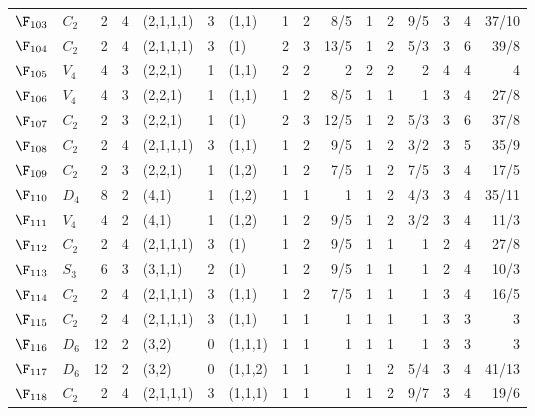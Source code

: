 \begin{landscape}
{\begin{longtable}{@{}l l r r l r l rrr rrr rrr@{}}
\addlinespace[3pt]
\textbf{$\F_{103}$} & $C_{2}$ & 2 & 4 & (2,1,1,1) & 3 & (1,1) & 1 & 2 & 8/5 & 1 & 2 & 9/5 & 3 & 4 & 37/10 \\
\addlinespace[3pt]
\textbf{$\F_{104}$} & $C_{2}$ & 2 & 4 & (2,1,1,1) & 3 & (1) & 2 & 3 & 13/5 & 1 & 2 & 5/3 & 3 & 6 & 39/8 \\
\addlinespace[3pt]
\textbf{$\F_{105}$} & $V_{4}$ & 4 & 3 & (2,2,1) & 1 & (1,1) & 2 & 2 & 2 & 2 & 2 & 2 & 4 & 4 & 4 \\
\addlinespace[3pt]
\textbf{$\F_{106}$} & $V_{4}$ & 4 & 3 & (2,2,1) & 1 & (1,1) & 1 & 2 & 8/5 & 1 & 1 & 1 & 3 & 4 & 27/8 \\
\addlinespace[3pt]
\textbf{$\F_{107}$} & $C_{2}$ & 2 & 3 & (2,2,1) & 1 & (1) & 2 & 3 & 12/5 & 1 & 2 & 5/3 & 3 & 6 & 37/8 \\
\addlinespace[3pt]
\textbf{$\F_{108}$} & $C_{2}$ & 2 & 4 & (2,1,1,1) & 3 & (1,1) & 1 & 2 & 9/5 & 1 & 2 & 3/2 & 3 & 5 & 35/9 \\
\addlinespace[3pt]
\textbf{$\F_{109}$} & $C_{2}$ & 2 & 3 & (2,2,1) & 1 & (1,2) & 1 & 2 & 7/5 & 1 & 2 & 7/5 & 3 & 4 & 17/5 \\
\addlinespace[3pt]
\textbf{$\F_{110}$} & $D_{4}$ & 8 & 2 & (4,1) & 1 & (1,2) & 1 & 1 & 1 & 1 & 2 & 4/3 & 3 & 4 & 35/11 \\
\addlinespace[3pt]
\textbf{$\F_{111}$} & $V_{4}$ & 4 & 2 & (4,1) & 1 & (1,2) & 1 & 2 & 9/5 & 1 & 2 & 3/2 & 3 & 4 & 11/3 \\
\addlinespace[3pt]
\textbf{$\F_{112}$} & $C_{2}$ & 2 & 4 & (2,1,1,1) & 3 & (1) & 1 & 2 & 9/5 & 1 & 1 & 1 & 2 & 4 & 27/8 \\
\addlinespace[3pt]
\textbf{$\F_{113}$} & $S_{3}$ & 6 & 3 & (3,1,1) & 2 & (1) & 1 & 2 & 9/5 & 1 & 1 & 1 & 2 & 4 & 10/3 \\
\addlinespace[3pt]
\textbf{$\F_{114}$} & $C_{2}$ & 2 & 4 & (2,1,1,1) & 3 & (1,1) & 1 & 2 & 7/5 & 1 & 1 & 1 & 3 & 4 & 16/5 \\
\addlinespace[3pt]
\textbf{$\F_{115}$} & $C_{2}$ & 2 & 4 & (2,1,1,1) & 3 & (1,1) & 1 & 1 & 1 & 1 & 1 & 1 & 3 & 3 & 3 \\
\addlinespace[3pt]
\textbf{$\F_{116}$} & $D_{6}$ & 12 & 2 & (3,2) & 0 & (1,1,1) & 1 & 1 & 1 & 1 & 1 & 1 & 3 & 3 & 3 \\
\addlinespace[3pt]
\textbf{$\F_{117}$} & $D_{6}$ & 12 & 2 & (3,2) & 0 & (1,1,2) & 1 & 1 & 1 & 1 & 2 & 5/4 & 3 & 4 & 41/13 \\
\addlinespace[3pt]
\textbf{$\F_{118}$} & $C_{2}$ & 2 & 4 & (2,1,1,1) & 3 & (1,1,1) & 1 & 1 & 1 & 1 & 2 & 9/7 & 3 & 4 & 19/6 \\

\end{longtable}}
\end{landscape}
